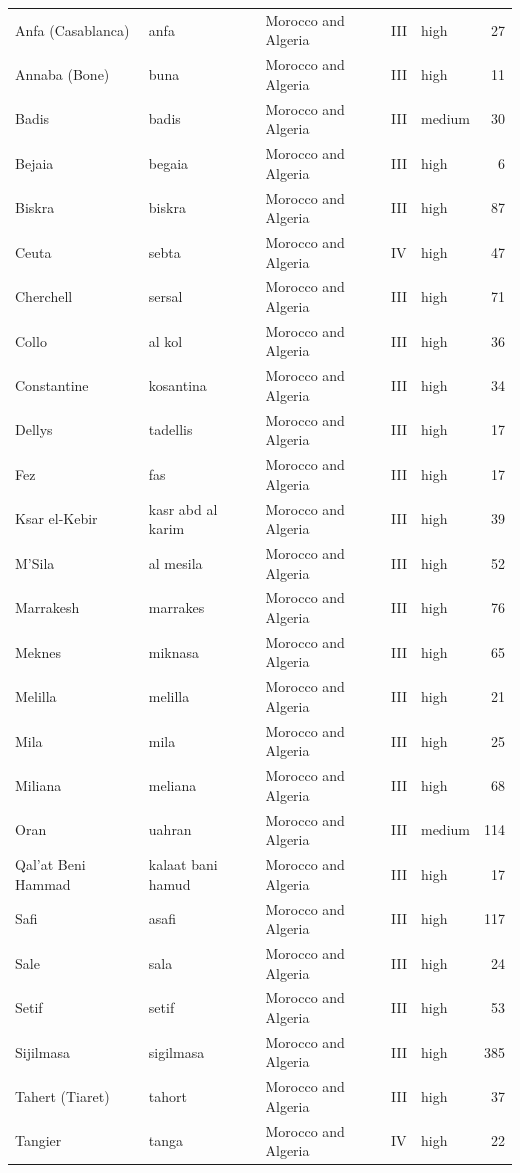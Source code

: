 \documentclass[11pt,a4paper]{article}
\begin{document}
{\begin{longtable}{p{4.6cm}p{3.0cm}p{3.6cm}llr}
Anfa (Casablanca) & anfa & Morocco and Algeria & III & high & 27\\
Annaba (Bone) & buna & Morocco and Algeria & III & high & 11\\
Badis & badis & Morocco and Algeria & III & medium & 30\\
Bejaia & begaia & Morocco and Algeria & III & high & 6\\
Biskra & biskra & Morocco and Algeria & III & high & 87\\
Ceuta & sebta & Morocco and Algeria & IV & high & 47\\
Cherchell & sersal & Morocco and Algeria & III & high & 71\\
Collo & al kol & Morocco and Algeria & III & high & 36\\
Constantine & kosantina & Morocco and Algeria & III & high & 34\\
Dellys & tadellis & Morocco and Algeria & III & high & 17\\
Fez & fas & Morocco and Algeria & III & high & 17\\
Ksar el-Kebir & kasr abd al karim & Morocco and Algeria & III & high & 39\\
M'Sila & al mesila & Morocco and Algeria & III & high & 52\\
Marrakesh & marrakes & Morocco and Algeria & III & high & 76\\
Meknes & miknasa & Morocco and Algeria & III & high & 65\\
Melilla & melilla & Morocco and Algeria & III & high & 21\\
Mila & mila & Morocco and Algeria & III & high & 25\\
Miliana & meliana & Morocco and Algeria & III & high & 68\\
Oran & uahran & Morocco and Algeria & III & medium & 114\\
Qal'at Beni Hammad & kalaat bani hamud & Morocco and Algeria & III & high & 17\\
Safi & asafi & Morocco and Algeria & III & high & 117\\
Sale & sala & Morocco and Algeria & III & high & 24\\
Setif & setif & Morocco and Algeria & III & high & 53\\
Sijilmasa & sigilmasa & Morocco and Algeria & III & high & 385\\
Tahert (Tiaret) & tahort & Morocco and Algeria & III & high & 37\\
Tangier & tanga & Morocco and Algeria & IV & high & 22\\

\end{longtable}}
\end{document}
